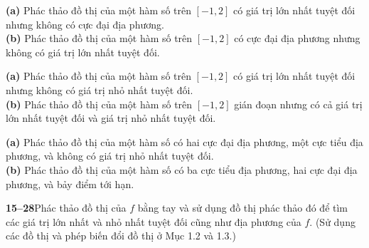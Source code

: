 \fontsize{9pt}{11.3pt}\selectfont

\noindent
\begin{minipage}[t]{0.485\textwidth}
\textbf{(a)} Phác thảo đồ thị của một hàm số trên $[-1, 2]$ có giá trị lớn nhất tuyệt đối nhưng không có cực đại địa phương.\\[1pt]
\makebox[1.6em][l]{}\textbf{(b)} Phác thảo đồ thị của một hàm số trên $[-1, 2]$ có cực đại địa phương nhưng không có giá trị lớn nhất tuyệt đối.

\vspace{6pt}
\textbf{(a)} Phác thảo đồ thị của một hàm số trên $[-1, 2]$ có giá trị lớn nhất tuyệt đối nhưng không có giá trị nhỏ nhất tuyệt đối.\\[1pt]
\makebox[1.6em][l]{}\textbf{(b)} Phác thảo đồ thị của một hàm số trên $[-1, 2]$ gián đoạn nhưng có cả giá trị lớn nhất tuyệt đối và giá trị nhỏ nhất tuyệt đối.

\vspace{6pt}
\textbf{(a)} Phác thảo đồ thị của một hàm số có hai cực đại địa phương, một cực tiểu địa phương, và không có giá trị nhỏ nhất tuyệt đối.\\[1pt]
\makebox[1.6em][l]{}\textbf{(b)} Phác thảo đồ thị của một hàm số có ba cực tiểu địa phương, hai cực đại địa phương, và bảy điểm tới hạn.

\vspace{6pt}
{\color{stewartcyan}\textbf{15--28}}\quad Phác thảo đồ thị của $f$ bằng tay và sử dụng đồ thị phác thảo đó để tìm các giá trị lớn nhất và nhỏ nhất tuyệt đối cũng như địa phương của $f$. (Sử dụng các đồ thị và phép biến đổi đồ thị ở Mục 1.2 và 1.3.)


\end{minipage}
